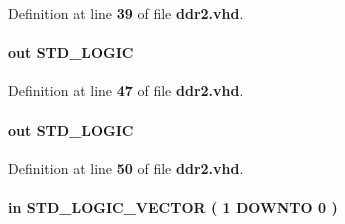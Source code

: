 Definition at line {\bf 39} of file {\bf ddr2.\+vhd}.

\paragraph[{local\+\_\+ready}]{ {\bfseries \textcolor{keywordflow}{out}\textcolor{vhdlchar}{ }} {\bfseries \textcolor{comment}{S\+T\+D\+\_\+\+L\+O\+G\+IC}\textcolor{vhdlchar}{ }} \hspace{0.3cm}{\ttfamily [Port]}}\label{classddr2_aed35ac846fd69bac4d53f5a38074c4a5}


Definition at line {\bf 47} of file {\bf ddr2.\+vhd}.

\paragraph[{local\+\_\+refresh\+\_\+ack}]{ {\bfseries \textcolor{keywordflow}{out}\textcolor{vhdlchar}{ }} {\bfseries \textcolor{comment}{S\+T\+D\+\_\+\+L\+O\+G\+IC}\textcolor{vhdlchar}{ }} \hspace{0.3cm}{\ttfamily [Port]}}\label{classddr2_ad487340b969abbc11de88f812ddefffd}


Definition at line {\bf 50} of file {\bf ddr2.\+vhd}.

\paragraph[{local\+\_\+size}]{ {\bfseries \textcolor{keywordflow}{in}\textcolor{vhdlchar}{ }} {\bfseries \textcolor{comment}{S\+T\+D\+\_\+\+L\+O\+G\+I\+C\+\_\+\+V\+E\+C\+T\+OR}\textcolor{vhdlchar}{ }\textcolor{vhdlchar}{(}\textcolor{vhdlchar}{ }\textcolor{vhdlchar}{ } \textcolor{vhdldigit}{1} \textcolor{vhdlchar}{ }\textcolor{keywordflow}{D\+O\+W\+N\+TO}\textcolor{vhdlchar}{ }\textcolor{vhdlchar}{ } \textcolor{vhdldigit}{0} \textcolor{vhdlchar}{ }\textcolor{vhdlchar}{)}\textcolor{vhdlchar}{ }} \hspace{0.3cm}{\ttfamily [Port]}}\label{classddr2_a3c471ebf0dd609278cf29a09306c8c09}



